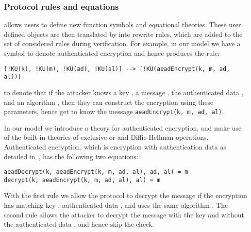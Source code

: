 
\spacehack
\subsubsection{Protocol rules and equations}
\mTamarin{} allows users to define new function symbols and equational theories.
These user defined objects are then translated by \mTamarin{} into rewrite
rules, which are added to the set of considered rules during verification.
For example, in our model we have a symbol to denote authenticated encryption and
hence \mTamarin{} produces the rule:
%
\begin{lstlisting}
[!KU(k), !KU(m), !KU(ad), !KU(al)] --> [!KU(aeadEncrypt(k, m, ad, al))]
\end{lstlisting}
%
to denote that if the attacker knows a key , a message , the
authenticated data , and an algorithm , then they can construct
the encryption using these parameters, hence get to know the message
\lstinline{aeadEncrypt(k, m, ad, al)}.

In our model we introduce a theory for authenticated encryption, and make use of
the built-in theories of exclusive-or and Diffie-Hellman operations.
%
Authenticated encryption, which is encryption with authentication data as
detailed in~\cite{aead}, has the following two equations:
\begin{lstlisting}
aeadDecrypt(k, aeadEncrypt(k, m, ad, al), ad, al) = m
decrypt(k, aeadEncrypt(k, m, ad, al), al) = m
\end{lstlisting}
With the first rule we allow the protocol to decrypt the message  if the
encryption has matching key , authenticated data , and uses the
same algorithm .
%
The second rule allows the attacker to decrypt the message  with the key
 and without the authenticated data , and hence skip the check.

